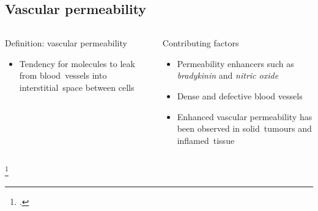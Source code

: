 \documentclass[aspectratio=169,compress]{beamer}
\newcommand*{\autotitle}{\subsecname\hfill\textbf{\small\secname}}
\begin{document}
\subsection{Vascular permeability}
\begin{frame}{\autotitle}
  \begin{columns}
      \begin{block}{Definition: vascular permeability}
        \begin{itemize}
          \item Tendency for molecules to leak from \alert{blood~vessels} into \alert{interstitial~space} between cells
        \end{itemize}
      \end{block}

      \begin{block}{Contributing factors}
        \begin{itemize}
          \item Permeability enhancers such as \emph{bradykinin} and \emph{nitric oxide}
          \item Dense and defective blood vessels
          \item Enhanced vascular permeability has been observed in \alert{solid~tumours} and \alert{inflamed~tissue}~
        \end{itemize}
      \end{block}

  \end{columns}
  \footcitetext{maeda2000tumor}
\end{frame}
\end{document}
